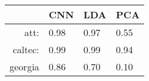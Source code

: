 \begin{tabular}{|r|l|l|l|}
  \hline
    & CNN & LDA & PCA \\
  \hline
  att: & 0.98 & 0.97 & 0.55 \\
  \hline
  caltec: & 0.99 & 0.99 & 0.94 \\
  \hline
  georgia & 0.86 & 0.70 & 0.10 \\
  \hline
\end{tabular}
